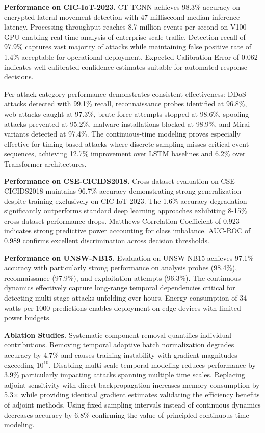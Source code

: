 \textbf{Performance on CIC-IoT-2023.} CT-TGNN achieves 98.3\% accuracy on encrypted lateral movement detection with 47 millisecond median inference latency. Processing throughput reaches 8.7 million events per second on V100 GPU enabling real-time analysis of enterprise-scale traffic. Detection recall of 97.9\% captures vast majority of attacks while maintaining false positive rate of 1.4\% acceptable for operational deployment. Expected Calibration Error of 0.062 indicates well-calibrated confidence estimates suitable for automated response decisions.

Per-attack-category performance demonstrates consistent effectiveness: DDoS attacks detected with 99.1\% recall, reconnaissance probes identified at 96.8\%, web attacks caught at 97.3\%, brute force attempts stopped at 98.6\%, spoofing attacks prevented at 95.2\%, malware installations blocked at 98.9\%, and Mirai variants detected at 97.4\%. The continuous-time modeling proves especially effective for timing-based attacks where discrete sampling misses critical event sequences, achieving 12.7\% improvement over LSTM baselines and 6.2\% over Transformer architectures.

\textbf{Performance on CSE-CICIDS2018.} Cross-dataset evaluation on CSE-CICIDS2018 maintains 96.7\% accuracy demonstrating strong generalization despite training exclusively on CIC-IoT-2023. The 1.6\% accuracy degradation significantly outperforms standard deep learning approaches exhibiting 8-15\% cross-dataset performance drops. Matthews Correlation Coefficient of 0.923 indicates strong predictive power accounting for class imbalance. AUC-ROC of 0.989 confirms excellent discrimination across decision thresholds.

\textbf{Performance on UNSW-NB15.} Evaluation on UNSW-NB15 achieves 97.1\% accuracy with particularly strong performance on analysis probes (98.4\%), reconnaissance (97.9\%), and exploitation attempts (96.3\%). The continuous dynamics effectively capture long-range temporal dependencies critical for detecting multi-stage attacks unfolding over hours. Energy consumption of 34 watts per 1000 predictions enables deployment on edge devices with limited power budgets.

\textbf{Ablation Studies.} Systematic component removal quantifies individual contributions. Removing temporal adaptive batch normalization degrades accuracy by 4.7\% and causes training instability with gradient magnitudes exceeding $10^{10}$. Disabling multi-scale temporal modeling reduces performance by 3.9\% particularly impacting attacks spanning multiple time scales. Replacing adjoint sensitivity with direct backpropagation increases memory consumption by 5.3× while providing identical gradient estimates validating the efficiency benefits of adjoint methods. Using fixed sampling intervals instead of continuous dynamics decreases accuracy by 6.8\% confirming the value of principled continuous-time modeling.

